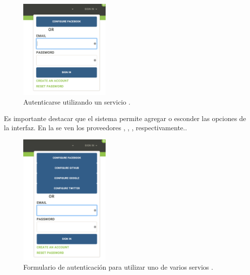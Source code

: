 \begin{figure}[H]
	\centering
	\includegraphics[width=0.4\textwidth]{figuras/architecture/accounts/login/log_in_plus_facebook.png}

	\caption{Autenticarse utilizando un servicio \thirdParty.}
	\label{figure:architecture:accounts:login:log_in_plus_facebook}
\end{figure}

Es importante destacar que el sistema permite agregar o esconder las opciones \thirdParty de la interfaz. En la  se ven los proveedores \oauthLoginINT \facebook, \gitHubNAME, \googleNAME, \twitterNAME respectivamente..

\begin{figure}[H]
	\centering
	\includegraphics[width=0.4\textwidth]{figuras/architecture/accounts/login/log_in_all_package.png}

	\caption{Formulario de autenticación para utilizar uno de varios servios \thirdParty.}
	\label{figure:architecture:accounts:login:log_in_all_package}
\end{figure}